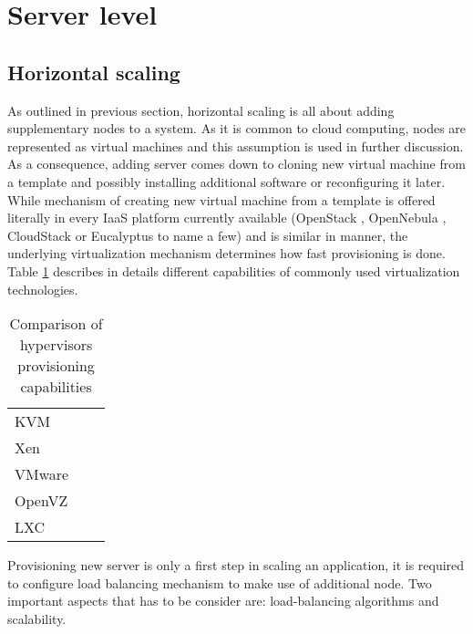 \section{Server level}

\subsection{Horizontal scaling}
As outlined in previous section, horizontal scaling is all about adding supplementary nodes to a system. As it is common to cloud computing, nodes are represented as virtual machines and this assumption is used in further discussion. As a consequence, adding server comes down to cloning new virtual machine from a template and possibly installing additional software or reconfiguring it later. While mechanism of creating new virtual machine from a template is offered literally in every IaaS platform currently available (OpenStack \cite{OpenStack}, OpenNebula \cite{OpenNebula}, CloudStack \cite{CloudStack} or Eucalyptus \cite{Eucalyptus} to name a few) and is similar in manner, the underlying virtualization mechanism determines how fast provisioning is done. Table \ref{tab:hypervisors-provisioning} describes in details different capabilities of commonly used virtualization technologies.

\begin{table}[!htbp]
\begin{tabularx}{\textwidth}{l | X | X}
 &  & \\
\hline 
KVM &  & \\
\hline
Xen &  & \\
\hline
VMware &  & \\
\hline
OpenVZ &  & \\
\hline
LXC &  &  \\
\end{tabularx}
\caption{Comparison of hypervisors provisioning capabilities}
\label{tab:hypervisors-provisioning}
\end{table}

Provisioning new server is only a first step in scaling an application, it is required to configure load balancing mechanism to make use of additional node. Two important aspects that has to be consider are: load-balancing algorithms and scalability.


